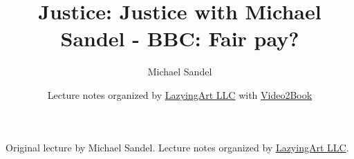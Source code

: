 \documentclass[11pt,oneside]{book}
\begin{document}
\frontmatter
\title{Justice: Justice with Michael Sandel - BBC: Fair pay?}
\author{Michael Sandel}
\date{Lecture notes organized by \href{https://lazying.art}{LazyingArt LLC} with \href{https://github.com/lachlanchen/Video2Book}{Video2Book}}
\maketitle
\begin{center}
\small Original lecture by Michael Sandel. Lecture notes organized by \href{https://lazying.art}{LazyingArt LLC}.
\end{center}
\clearpage
\mainmatter

\end{document}
